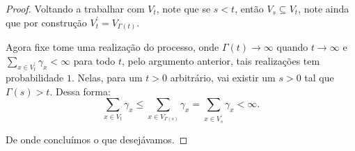 \begin{proof}
  Voltando a trabalhar com $V_t$, note que se $s < t$, então $V_s
  \subseteq V_t$, note ainda que por construção $V^\prime_t =
  V_{\Gamma(t)}$.

  Agora fixe tome uma realização do processo, onde $\Gamma(t) \to
  \infty$ quando $t \to \infty$ e $\sum_{x \in V^\prime_t} \gamma_x <
  \infty$ para todo $t$, pelo argumento anterior, tais realizações tem
  probabilidade $1$. Nelas, para um $t > 0$ arbitrário, vai existir
  um $s > 0$ tal que $\Gamma(s) > t$. Dessa forma:
  \begin{displaymath}
    \sum_{x \in V_t} \gamma_x \leq \sum_{x \in V_{\Gamma(s)}}
    \gamma_x =
    \sum_{x \in V^\prime_s} \gamma_x < \infty.
  \end{displaymath}

  De onde concluímos o que desejávamos.
\end{proof}


